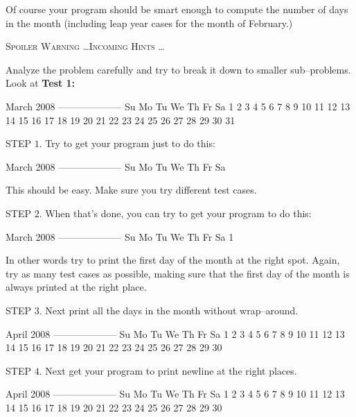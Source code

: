 Of course your program should be smart enough to compute the number of days in
the month (including leap year cases for the month of February.)

\newpage

\textsc{\large Spoiler Warning \dots Incoming Hints \dots}

Analyze the problem carefully and try to break it down to smaller sub--problems.
Look at \textbf{Test 1:}
\begin{console}[commandchars=\\\{\}]
March 2008
--------------------
Su Mo Tu We Th Fr Sa  
                   1
 2  3  4  5  6  7  8
 9 10 11 12 13 14 15 
16 17 18 19 20 21 22
23 24 25 26 27 28 29
30 31
\end{console}

STEP $1$. Try to get your program just to do this:
\begin{console}[commandchars=\\\{\}]
March 2008
--------------------
Su Mo Tu We Th Fr Sa
\end{console}  
This should be easy. Make sure you try different test cases. 

STEP $2$. When that's done, you can try to get your program to do this:
\begin{console}[commandchars=\\\{\}]
March 2008
--------------------
Su Mo Tu We Th Fr Sa
                   1
\end{console}
In other words try to print the first day of the month at the right spot.
Again, try as many test cases as possible, making sure that the first day of
the month is always printed at the right place.

STEP $3$. Next print all the days in the month without wrap--around.
{\scriptsize
\begin{console}[commandchars=\\\{\}]
April 2008
--------------------
Su Mo Tu We Th Fr Sa
       1  2  3  4  5  6  7  8  9 10 11 12 13 14 15 16 17 18 19 20 21 22 23 24 25 26 27 28 29 30
\end{console}
}

STEP $4$. Next get your program to print newline at the right places.
\begin{console}[commandchars=\\\{\}]
April 2008
--------------------
Su Mo Tu We Th Fr Sa
       1  2  3  4  5  
 6  7  8  9 10 11 12 
13 14 15 16 17 18 19 
20 21 22 23 24 25 26 
27 28 29 30
\end{console}
